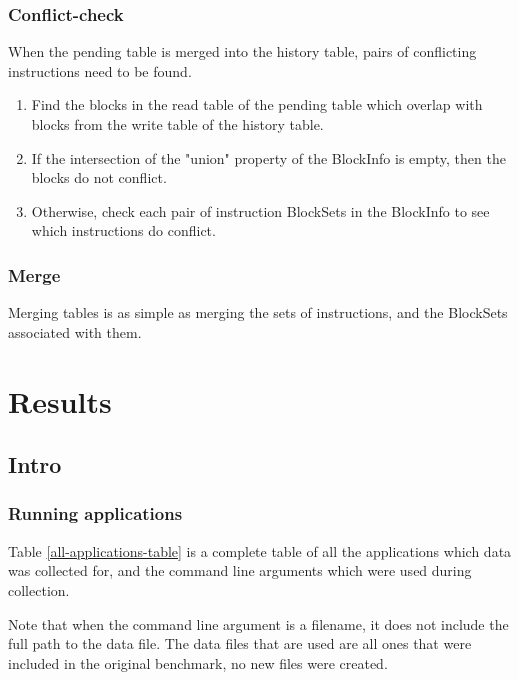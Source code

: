 \documentclass[12pt,twoside]{reedthesis}
\begin{document}
			
			\subsection{Conflict-check}
			
			When the pending table is merged into the history table, pairs of conflicting instructions need to be found. 
			
			\begin{enumerate}
				\item Find the blocks in the read table of the pending table which overlap with blocks from the write table of the history table. 
				\item If the intersection of the "union" property of the BlockInfo is empty, then the blocks do not conflict.
				\item Otherwise, check each pair of instruction BlockSets in the BlockInfo to see which instructions do conflict. 
			\end{enumerate}
			
			
			\subsection{Merge}
			
			Merging tables is as simple as merging the sets of instructions, and the BlockSets associated with them. 
			
			
\chapter{Results}
	
	\section{Intro}
	
		\subsection{Running applications}
		
		Table \ref{all-applications-table} is a complete table of all the applications which data was collected for, and the command line arguments which were used during collection. 
		
		Note that when the command line argument is a filename, it does not include the full path to the data file. The data files that are used are all ones that were included in the original benchmark, no new files were created. 
		
\end{document}
